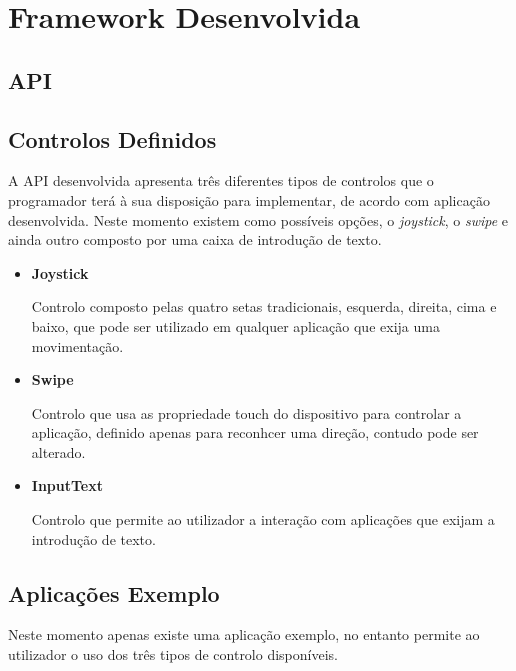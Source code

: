 \section{Framework Desenvolvida} \label{sec:framework}

\subsection{API}

\subsection{Controlos Definidos}

	A API desenvolvida apresenta três diferentes tipos de controlos que o programador terá à sua disposição para implementar, de acordo com aplicação desenvolvida. Neste momento existem como possíveis opções, o \textit{joystick}, o \textit{swipe} e ainda outro composto por uma caixa de introdução de texto.

	\begin{itemize}

	\item \textbf{Joystick}

		Controlo composto pelas quatro setas tradicionais, esquerda, direita, cima e baixo, que pode ser utilizado em qualquer aplicação que exija uma movimentação.

	\item \textbf{Swipe}

		Controlo que usa as propriedade touch do dispositivo para controlar a aplicação, definido apenas para reconhcer uma direção, contudo pode ser alterado.

	\item \textbf{InputText}

		Controlo que permite ao utilizador a interação com aplicações que exijam a introdução de texto.

	\end{itemize}


	
\subsection{Aplicações Exemplo}

	Neste momento apenas existe uma aplicação exemplo, no entanto permite ao utilizador o uso dos três tipos de controlo disponíveis.
	



